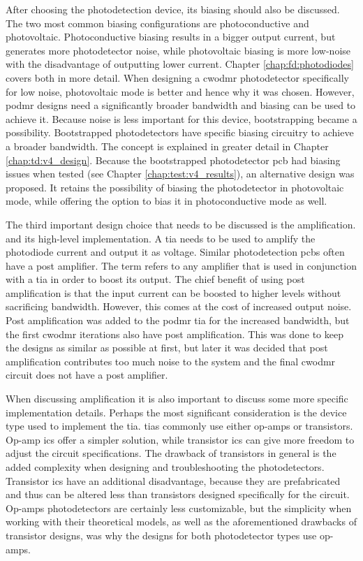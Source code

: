After choosing the photodetection device, its biasing should also be discussed. The two most common biasing configurations are photoconductive and photovoltaic. Photoconductive biasing results in a bigger output current, but generates more photodetector noise, while photovoltaic biasing is more low-noise with the disadvantage of outputting lower current. Chapter \ref{chap:fd:photodiodes} covers both in more detail. When designing a \gls{cwodmr} photodetector specifically for low noise, photovoltaic mode is better and hence why it was chosen. However, \gls{podmr} designs need a significantly broader bandwidth and biasing can be used to achieve it. Because noise is less important for this device, bootstrapping became a possibility. Bootstrapped photodetectors have specific biasing circuitry to achieve a broader bandwidth. The concept is explained in greater detail in Chapter \ref{chap:td:v4_design}. Because the bootstrapped photodetector \gls{pcb} had biasing issues when tested (see Chapter \ref{chap:test:v4_results}), an alternative design was proposed. It retains the possibility of biasing the photodetector in photovoltaic mode, while offering the option to bias it in photoconductive mode as well.

The third important design choice that needs to be discussed is the amplification. and its high-level implementation. A \gls{tia} needs to be used to amplify the photodiode current and output it as voltage. Similar photodetection \glspl{pcb} often have a post amplifier. The term refers to any amplifier that is used in conjunction with a \gls{tia} in order to boost its output. The chief benefit of using post amplification is that the input current can be boosted to higher levels without sacrificing bandwidth. However, this comes at the cost of increased output noise. Post amplification was added to the \gls{podmr} \gls{tia} for the increased bandwidth, but the first \gls{cwodmr} iterations also have post amplification. This was done to keep the designs as similar as possible at first, but later it was decided that post amplification contributes too much noise to the system and the final \gls{cwodmr} circuit does not have a post amplifier.

When discussing amplification it is also important to discuss some more specific implementation details. Perhaps the most significant consideration is the device type used to implement the \gls{tia}. \glspl{tia} commonly use either op-amps or transistors. Op-amp \glspl{ic} offer a simpler solution, while transistor \glspl{ic} can give more freedom to adjust the circuit specifications. The drawback of transistors in general is the added complexity when designing and troubleshooting the photodetectors. Transistor \glspl{ic} have an additional disadvantage, because they are prefabricated and thus can be altered less than transistors designed specifically for the circuit. Op-amps photodetectors are certainly less customizable, but the simplicity when working with their theoretical models, as well as the aforementioned drawbacks of transistor designs, was why the designs for both photodetector types use op-amps.

